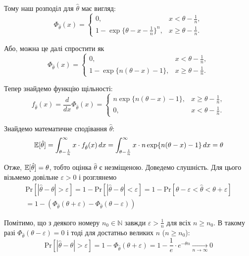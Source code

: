 \documentclass{hw_template}
\begin{document}
Тому наш розподіл для $\hat{\theta}$ має вигляд:
\begin{equation*}
    \Phi_{\hat{\theta}}(x) = 
    \begin{cases}
        0, & x < \theta - \frac{1}{n}, \\
        1 - \exp\{\theta - x - \frac{1}{n}\}^n, & x \geq \theta - \frac{1}{n}.
    \end{cases}
\end{equation*}

Або, можна це далі спростити як
\begin{equation*}
    \Phi_{\hat{\theta}}(x) = 
    \begin{cases}
        0, & x < \theta - \frac{1}{n}, \\
        1 - \exp\{n(\theta - x) - 1\}, & x \geq \theta - \frac{1}{n}.
    \end{cases}
\end{equation*}

Тепер знайдемо функцію щільності:
\begin{equation*}
    f_{\hat{\theta}}(x) = \frac{d}{dx} \Phi_{\hat{\theta}}(x) = 
    \begin{cases}
        n \exp\{n(\theta - x) - 1\}, & x \geq \theta - \frac{1}{n}, \\
        0, & x < \theta - \frac{1}{n}.
    \end{cases}
\end{equation*}

Знайдемо математичне сподівання $\hat{\theta}$:
\begin{align*}
    \mathbb{E}[\hat{\theta}] = \int_{\theta - \frac{1}{n}}^{\infty} x \cdot f_{\hat{\theta}}(x) \, dx = \int_{\theta - \frac{1}{n}}^{\infty} x \cdot n \exp\{n(\theta - x) - 1\} \, dx = \theta
\end{align*}

Отже, $\mathbb{E}[\hat{\theta}] = \theta$, тобто оцінка $\hat{\theta}$ є незміщеною. Доведемо слушність. Для цього візьмемо довільне $\varepsilon > 0$ і розглянемо
\begin{align*}
    \text{Pr}[|\hat{\theta} - \theta| > \varepsilon] = 1 - \text{Pr}[|\hat{\theta} - \theta| < \varepsilon] = 1 - \text{Pr}[\theta - \varepsilon < \hat{\theta} < \theta + \varepsilon] \\
    = 1 - (\Phi_{\hat{\theta}}(\theta + \varepsilon) - \Phi_{\hat{\theta}}(\theta - \varepsilon))
\end{align*}

Помітимо, що з деякого номеру $n_0 \in \mathbb{N}$ завжди $\varepsilon > \frac{1}{n}$ для всіх $n \geq n_0$. В такому разі $\Phi_{\hat{\theta}}(\theta-\varepsilon) = 0$ і тоді для достатньо великих $n$ ($n \geq n_0$):
\begin{equation*}
    \text{Pr}[|\hat{\theta} - \theta| > \varepsilon] = 1 - \Phi_{\hat{\theta}}(\theta + \varepsilon) = 1 - \frac{1}{e} \cdot e^{-\theta n} \xrightarrow[n \to \infty]{} 0
\end{equation*}
\end{document}
